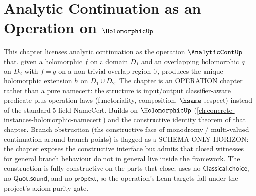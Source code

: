 \chapter{Analytic Continuation as an Operation on \(\HolomorphicUp\)}
\label{ch:concrete-instances-analytic-continuation}

This chapter licenses analytic continuation as the operation \(\AnalyticContUp\) that, given a holomorphic \(f\) on a domain \(D_1\) and an overlapping holomorphic \(g\) on \(D_2\) with \(f = g\) on a non-trivial overlap region \(U\), produces the unique holomorphic extension \(h\) on \(D_1 \cup D_2\). The chapter is an OPERATION chapter rather than a pure namecert: the structure is input/output classifier-aware predicate plus operation laws (functoriality, composition, \(\hsame\)-respect) instead of the standard 5-field NameCert. Builds on \(\HolomorphicUp\) (\autoref{ch:concrete-instances-holomorphic-namecert}) and the constructive identity theorem of that chapter. Branch obstruction (the constructive face of monodromy / multi-valued continuation around branch points) is flagged as a SCHEMA-ONLY HORIZON: the chapter exposes the constructive interface but admits that closed witnesses for general branch behaviour do not in general live inside the framework. The construction is fully constructive on the parts that close; uses no \(\mathsf{Classical.choice}\), no \(\mathsf{Quot.sound}\), and no \(\mathsf{propext}\), so the operation's Lean targets fall under the project's axiom-purity gate.


